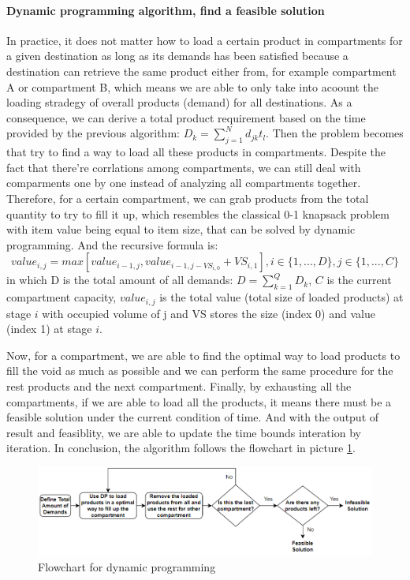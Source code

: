 \documentclass{article}
\begin{document}
\paragraph{Dynamic programming algorithm, find a feasible solution}
In practice, it does not matter how to load a certain product in compartments for a given destination as long as its demands has been satisfied because a destination can retrieve the same product either from, for example compartment A or compartment  B, which means we are able to only take into acoount the loading stradegy of overall products (demand) for all destinations. As a consequence, we can derive a total product requirement based on the time provided by the previous algorithm: $D_k={\sum_{j=1}^{N}}d_{jk}t_l$. Then the problem becomes that try to find a way to load all these products in compartments. Despite the fact that there're corrlations among compartments, we can still deal with comparments one by one instead of analyzing all compartments together. Therefore, for a certain compartment, we can grab products from the total quantity to try to fill it up, which resembles the classical 0-1 knapsack problem with item value being equal to item size, that can be solved by dynamic programming. And the recursive formula is:
\begin{equation}
value_{i,j} = max [value_{i-1,j}, value_{i-1,j-VS_{i,0}}+VS_{i,1}], i\in\{1,...,D\}, j\in\{1,...,C\}
\end{equation}
in which D is the total amount of all demands: $D={\sum_{k=1}^{Q}}D_k$, $C$ is the current compartment capacity, $value_{i,j}$ is the total value (total size of loaded products) at stage $i$ with occupied volume of j and VS stores the size (index 0) and value (index 1) at stage $i$. 

Now, for a compartment, we are able to find the optimal way to load products to fill the void as much as possible and we can perform the same procedure for the rest products and the next compartment. Finally, by exhausting all the compartments, if we are able to load all the products, it means there must be a feasible solution under the current condition of time. And with the output of result and feasiblity, we are able to update the time bounds interation by iteration. In conclusion, the algorithm follows the flowchart in picture \ref{fig:flowchartDP}.

\begin{figure}[ht]
    \centering
    \includegraphics[scale=0.8]{flowchartDP.png}
    \caption{Flowchart for dynamic programming}
    \label{fig:flowchartDP}
\end{figure}
\end{document}
